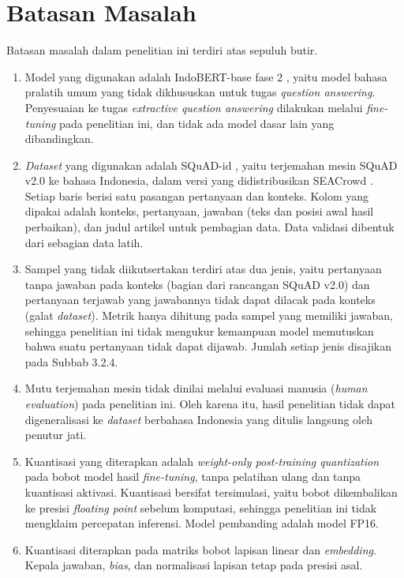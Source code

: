 \section{Batasan Masalah}

Batasan masalah dalam penelitian ini terdiri atas sepuluh butir.
\begin{enumerate}
    \item Model yang digunakan adalah IndoBERT-base fase 2 \parencite{wilie2020indonlu}, yaitu model bahasa pralatih umum yang tidak dikhususkan untuk tugas \textit{question answering}. Penyesuaian ke tugas \textit{extractive question answering} dilakukan melalui \textit{fine-tuning} pada penelitian ini, dan tidak ada model dasar lain yang dibandingkan.
    \item \textit{Dataset} yang digunakan adalah SQuAD-id \parencite{muis2020sequence}, yaitu terjemahan mesin SQuAD v2.0 ke bahasa Indonesia, dalam versi yang didistribusikan SEACrowd \parencite{lovenia2024seacrowd}. Setiap baris berisi satu pasangan pertanyaan dan konteks. Kolom yang dipakai adalah konteks, pertanyaan, jawaban (teks dan posisi awal hasil perbaikan), dan judul artikel untuk pembagian data. Data validasi dibentuk dari sebagian data latih.
    \item Sampel yang tidak diikutsertakan terdiri atas dua jenis, yaitu pertanyaan tanpa jawaban pada konteks (bagian dari rancangan SQuAD v2.0) dan pertanyaan terjawab yang jawabannya tidak dapat dilacak pada konteks (galat \textit{dataset}). Metrik hanya dihitung pada sampel yang memiliki jawaban, sehingga penelitian ini tidak mengukur kemampuan model memutuskan bahwa suatu pertanyaan tidak dapat dijawab. Jumlah setiap jenis disajikan pada Subbab 3.2.4.
    \item Mutu terjemahan mesin tidak dinilai melalui evaluasi manusia (\textit{human evaluation}) pada penelitian ini. Oleh karena itu, hasil penelitian tidak dapat digeneralisasi ke \textit{dataset} berbahasa Indonesia yang ditulis langsung oleh penutur jati.
    \item Kuantisasi yang diterapkan adalah \textit{weight-only post-training quantization} pada bobot model hasil \textit{fine-tuning}, tanpa pelatihan ulang dan tanpa kuantisasi aktivasi. Kuantisasi bersifat tersimulasi, yaitu bobot dikembalikan ke presisi \textit{floating point} sebelum komputasi, sehingga penelitian ini tidak mengklaim percepatan inferensi. Model pembanding adalah model FP16.
    \item Kuantisasi diterapkan pada matriks bobot lapisan linear dan \textit{embedding}. Kepala jawaban, \textit{bias}, dan normalisasi lapisan tetap pada presisi asal.

\end{enumerate}
